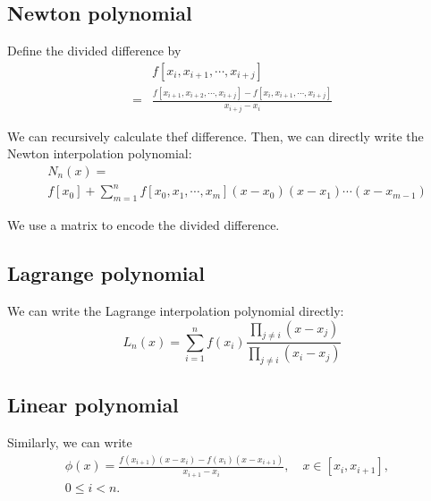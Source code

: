 \documentclass[conference]{IEEEtran}
\begin{document}
\subsection{Newton polynomial}
\par Define the divided difference by
\begin{equation}
    \begin{split}
        &f[x_i,x_{i+1},\cdots,x_{i+j}] \\
        = &\frac{f[x_{i+1},x_{i+2},\cdots,x_{i+j}]-f[x_i,x_{i+1},\cdots,x_{i+j}]} {x_{i+j}-x_i}
    \end{split}
\end{equation}
\par We can recursively calculate thef difference. Then, we can directly write the Newton interpolation polynomial:
\begin{equation}
    \begin{split}
        &N_n(x) = \\
        &f[x_0] + \sum_{m=1}^n f[x_0,x_1,\cdots,x_m](x-x_0)(x-x_1)\cdots(x-x_{m-1})
    \end{split}
\end{equation}

We use a matrix to encode the divided difference.
\subsection{Lagrange polynomial}
\par We can write the Lagrange interpolation polynomial directly:
\begin{equation}
    L_n(x) = \sum_{i=1}^n f(x_i) \frac{\prod_{j\neq i}(x-x_j)}{\prod_{j\neq i}(x_i-x_j)}
\end{equation} 


\subsection{Linear polynomial}
\par Similarly, we can write
\begin{equation}
    \begin{split}
        \phi(x) = \frac{f(x_{i+1})(x-x_i)-f(x_i)(x-x_{i+1})}{x_{i+1}-x_i},\quad x\in [x_i,x_{i+1}],&\\ 0\leq i<n.&
    \end{split}
\end{equation}
\end{document}
